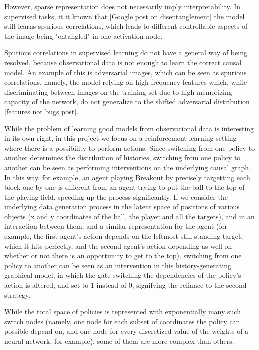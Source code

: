 \documentclass[a4paper,11pt,oneside]{report}
\begin{document}
However, sparse representation does not necessarily imply interpretability. In supervised tasks, it it known that [Google post on disentanglement] the model still learns spurious correlations, which leads to different controllable aspects of the image being "entangled" in one activation node.

Spurious correlations in supervised learning do not have a general way of being resolved, because observational data is not enough to learn the correct causal model. An example of this is adversarial images, which can be seen as spurious correlations, namely, the model relying on high-frequency features which, while discriminating between images on the training set due to high memorizing capacity of the network, do not generalize to the shifted adversarial distribution [features not bugs post].

While the problem of learning good models from observational data is interesting in its own right, in this project we focus on a reinforcement learning setting where there is a possibility to perform actions. Since switching from one policy to another determines the distribution of histories, switching from one policy to another can be seen as performing interventions on the underlying causal graph. In this way, for example, an agent playing Breakout by precisely targetting each block one-by-one is different from an agent trying to put the ball to the top of the playing field, speeding up the process significantly. If we consider the underlying data generation process in the latent space of positions of various objects (x and y coordinates of the ball, the player and all the targets), and in an interaction between them, and a similar representation for the agent (for example, the first agent's action depends on the leftmost still-standing target, which it hits perfectly, and the second agent's action depending as well on whether or not there is an opportunity to get to the top), switching from one policy to another can be seen as an intervention in this history-generating graphical model, in which the gate switching the dependencies of the policy's action is altered, and set to $1$ instead of $0$, signifying the reliance to the second strategy.

While the total space of policies is represented with exponentially many such switch nodes (namely, one node for each subset of coordinates the policy can possible depend on, and one node for every discretized value of the weights of a neural network, for example), some of them are more complex than others.
\end{document}
